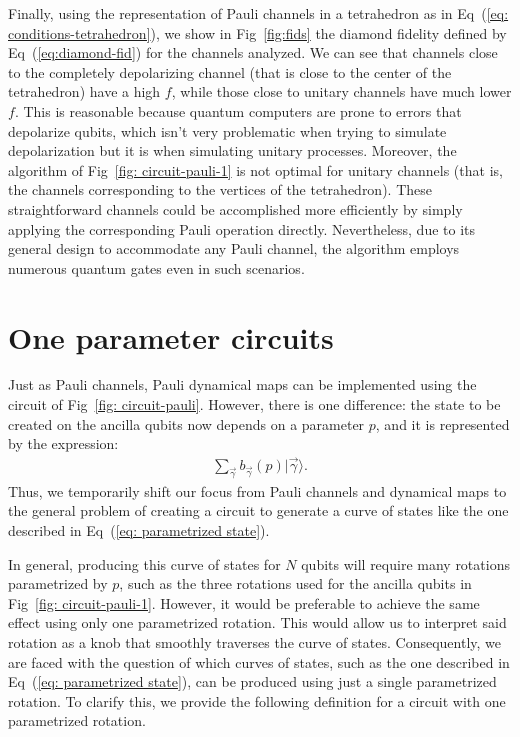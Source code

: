 \documentclass[10pt,letterpaper]{article} %
\newcommand{\fref}[1]{Fig~\ref{#1}}
\newcommand{\eref}[1]{Eq~(\ref{#1})}
\begin{document}
Finally, using the representation of Pauli channels in a tetrahedron as in
\eref{eq: conditions-tetrahedron}, we show in \fref{fig:fids} the diamond
fidelity defined by \eref{eq:diamond-fid} for the channels analyzed.  We can
see that channels close to the completely depolarizing channel (that is close
to the center of the tetrahedron) have a high $f$, while those close to unitary
channels have much lower $f$.  This is reasonable because quantum computers are
prone to errors that depolarize qubits, which isn't very problematic when
trying to simulate depolarization but it is when simulating unitary processes.
Moreover, the algorithm of \fref{fig: circuit-pauli-1} is not optimal for
unitary channels (that is, the channels corresponding to the vertices of the
tetrahedron).  These straightforward channels could be accomplished more
efficiently by simply applying the corresponding Pauli operation directly.
Nevertheless, due to its general design to accommodate any Pauli channel, the
algorithm employs numerous quantum gates even in such scenarios.


\section{One parameter circuits} %
\label{sec: 1PR Circuits}


Just as Pauli channels, Pauli dynamical maps can be implemented using the circuit
of \fref{fig: circuit-pauli}. However, there is one difference: 
the state to be created on the ancilla qubits now 
depends on a parameter $p$, and it is represented by the expression:
\begin{eqnarray}
\label{eq: parametrized state}
\sum_{\vec{\gamma}} b_{\vec{\gamma}}(p) |\vec{\gamma}\rangle.
\end{eqnarray}
Thus, we temporarily shift our focus from Pauli
channels and dynamical maps to the general problem of 
creating a circuit to generate a curve of
states like the one described in \eref{eq: parametrized state}.

In general, producing this curve of states for $N$ qubits will require
many rotations parametrized by $p$,
such as the three rotations used for the ancilla
qubits in \fref{fig: circuit-pauli-1}.
However, it would be preferable to achieve the same effect using only one parametrized rotation. 
This would allow us to interpret said rotation 
as a knob that smoothly traverses the curve of states.
Consequently, we are faced with the question of which curves of states, 
such as the one described in \eref{eq: parametrized state}, 
can be produced using just a single parametrized rotation. 
To clarify this, we provide the following definition 
for a circuit with one parametrized rotation.
\end{document}
